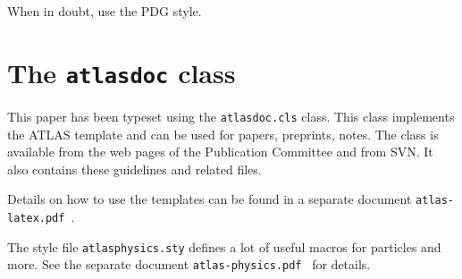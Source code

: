 \documentclass[UKenglish]{style/atlasdoc}
\begin{document}
When in doubt, use the PDG style.


\section{The \texttt{atlasdoc} class}
\label{sec:atlasdoc}

This paper has been typeset using the \texttt{atlasdoc.cls} class.
This class implements the ATLAS template and can be used for papers, preprints,
notes. The class is available from the web pages of the
Publication Committee and from SVN.
It also contains these guidelines and related files.

Details on how to use the templates can be found in a separate document
\texttt{atlas-latex.pdf}~\cite{atlas-latex}.

The style file \texttt{atlasphysics.sty} defines a lot of useful
macros for particles and more. See the separate document
\texttt{atlas-physics.pdf}~\cite{atlas-physics} for details.
\end{document}
